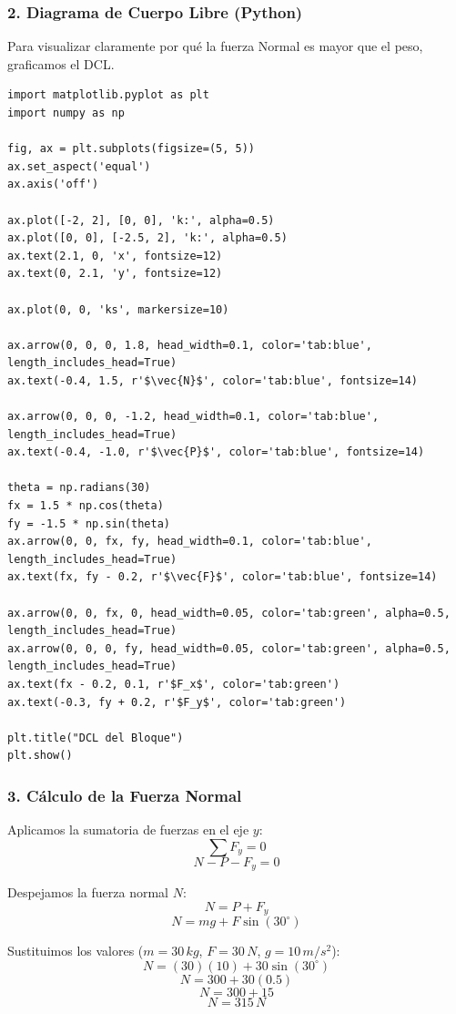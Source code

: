 \documentclass[12pt, a4paper]{article}
\begin{document}
\subsubsection*{2. Diagrama de Cuerpo Libre (Python)}
Para visualizar claramente por qué la fuerza Normal es mayor que el peso, graficamos el DCL.

\begin{lstlisting}
import matplotlib.pyplot as plt
import numpy as np

fig, ax = plt.subplots(figsize=(5, 5))
ax.set_aspect('equal')
ax.axis('off')

ax.plot([-2, 2], [0, 0], 'k:', alpha=0.5)
ax.plot([0, 0], [-2.5, 2], 'k:', alpha=0.5)
ax.text(2.1, 0, 'x', fontsize=12)
ax.text(0, 2.1, 'y', fontsize=12)

ax.plot(0, 0, 'ks', markersize=10)

ax.arrow(0, 0, 0, 1.8, head_width=0.1, color='tab:blue', length_includes_head=True)
ax.text(-0.4, 1.5, r'$\vec{N}$', color='tab:blue', fontsize=14)

ax.arrow(0, 0, 0, -1.2, head_width=0.1, color='tab:blue', length_includes_head=True)
ax.text(-0.4, -1.0, r'$\vec{P}$', color='tab:blue', fontsize=14)

theta = np.radians(30)
fx = 1.5 * np.cos(theta)
fy = -1.5 * np.sin(theta)
ax.arrow(0, 0, fx, fy, head_width=0.1, color='tab:blue', length_includes_head=True)
ax.text(fx, fy - 0.2, r'$\vec{F}$', color='tab:blue', fontsize=14)

ax.arrow(0, 0, fx, 0, head_width=0.05, color='tab:green', alpha=0.5, length_includes_head=True)
ax.arrow(0, 0, 0, fy, head_width=0.05, color='tab:green', alpha=0.5, length_includes_head=True)
ax.text(fx - 0.2, 0.1, r'$F_x$', color='tab:green')
ax.text(-0.3, fy + 0.2, r'$F_y$', color='tab:green')

plt.title("DCL del Bloque")
plt.show()
\end{lstlisting}

\subsubsection*{3. Cálculo de la Fuerza Normal}
Aplicamos la sumatoria de fuerzas en el eje $y$:
$$ \sum F_y = 0 $$
$$ N - P - F_y = 0 $$

Despejamos la fuerza normal $N$:
$$ N = P + F_y $$
$$ N = m g + F \sin(30^\circ) $$

Sustituimos los valores ($m = 30 \, \si{kg}$, $F = 30 \, \si{N}$, $g = 10 \, \si{m/s^2}$):
$$ N = (30)(10) + 30 \sin(30^\circ) $$
$$ N = 300 + 30 (0.5) $$
$$ N = 300 + 15 $$
$$ N = 315 \, \si{N} $$
\end{document}

